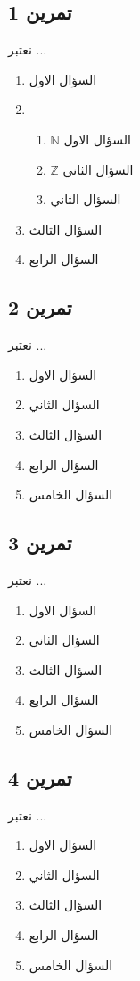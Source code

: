 \documentclass[12pt,a4paper]{article}
\newcommand{\N}{\mathbb{N}}
\newcommand{\Z}{\mathbb{Z}}
\begin{document}
\begin{multicols}{2}
\subsection*{\As تمرين 1}
 نعتبر  ...
\begin{enumerate}
\item السؤال الاول
\item \begin{enumerate}
        \item  $\N$ السؤال الاول
         \item $ \Z$ السؤال الثاني
         \item السؤال الثاني
        \end{enumerate}
\item السؤال الثالث
\item السؤال الرابع
\end{enumerate} 
\begin{center}  \end{center}
\subsection*{\As تمرين 2}
نعتبر ...
\begin{enumerate}
\item السؤال الاول
\item السؤال الثاني
\item السؤال الثالث
\item السؤال الرابع
\item السؤال الخامس
\end{enumerate}
\begin{center}  \end{center}
\subsection*{\As تمرين 3}
نعتبر ...
\begin{enumerate}
\item السؤال الاول
\item السؤال الثاني
\item السؤال الثالث
\item السؤال الرابع
\item السؤال الخامس
\end{enumerate}
\begin{center}  \end{center}
\subsection*{\As تمرين 4}
نعتبر ...
\begin{enumerate}
\item السؤال الاول
\item السؤال الثاني
\item السؤال الثالث
\item السؤال الرابع
\item السؤال الخامس
\end{enumerate}
\begin{center}  \end{center}

\end{multicols}
\end{document}
